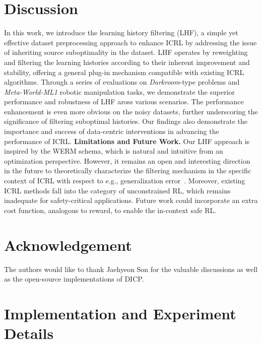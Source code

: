 \documentclass{article}
\begin{document}
\section{Discussion}
\label{discussion_section}
In this work, we introduce the learning history filtering (LHF), a simple yet effective dataset preprocessing approach to enhance ICRL by addressing the issue of inheriting source suboptimality in the dataset. LHF operates by reweighting and filtering the learning histories according to their inherent improvement and stability, offering a general plug-in mechanism compatible with existing ICRL algorithms.
Through a series of evaluations on \textit{Darkroom}-type problems and \textit{Meta-World-ML1} robotic manipulation tasks, we demonstrate the superior performance and robustness of LHF aross various scenarios. The performance enhancement is even more obvious on the noisy datasets, further underscoring the significance of filtering suboptimal histories.
Our findings also demonstrate the importance and success of data-centric interventions in advancing the performance of ICRL.
\textbf{Limitations and Future Work.}
Our LHF approach is inspired by the WERM schema, which is natural and intuitive from an optimization perspective. However, it remains an open and interesting direction in the future to theoretically characterize the filtering mechanism in the specific context of ICRL with respect to e.g., generalization error~\cite{lin2023transformers}.
Moreover, existing ICRL methods fall into the category of unconstrained RL, which remains inadequate for safety-critical applications. Future work could incorporate an extra cost function, analogous to reward, to enable the in-context safe RL.
\clearpage
\section*{Acknowledgement}
The authors would like to thank Jaehyeon Son for the valuable discussions as well as the open-source implementations of DICP.


\clearpage
\appendix
\section{Implementation and Experiment Details}
\end{document}
